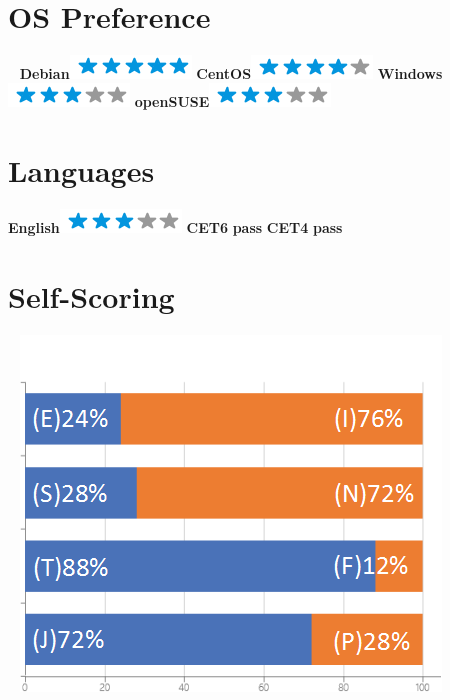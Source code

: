 \documentclass[]{friggeri-cv}
\begin{document}
\begin{aside}
~
~ 
 \section{OS Preference}
  ~
    \textbf{Debian}\includegraphics[scale=0.40]{img/5stars.png}
    \textbf{CentOS}\includegraphics[scale=0.40]{img/4stars.png}
    \textbf{Windows}\includegraphics[scale=0.40]{img/3stars.png}
    \textbf{openSUSE}\includegraphics[scale=0.40]{img/3stars.png}
  \section{Languages}
    \textbf{English}\includegraphics[scale=0.40]{img/3stars.png}
    \textbf{CET6} \hspace{7mm}  \textbf{pass}
    \textbf{CET4} \hspace{7mm}  \textbf{pass}
  ~    
  \section{Self-Scoring}
    ~
    \includegraphics[scale=0.32]{img/personal.png}
    ~

\end{aside}
\end{document}
